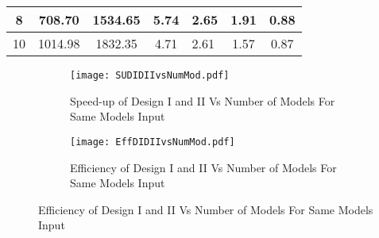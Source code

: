 \begin{table}
{\begin{tabular}{|c|c|c|c|l|c|c|}
8                                                                             & 708.70                                                                                                                                                                                                                        & 1534.65                                                                                                                                                                                                                     & 5.74                                                                                                                        & 2.65                                                                                                                                               & 1.91                                                                                   & 0.88                                                                                    \\ \hline
10                                                                            & 1014.98                                                                                                                                                                                                                       & 1832.35                                                                                                                                                                                                                     & 4.71                                                                                                                        & 2.61                                                                                                                                              & 1.57                                                                                   & 0.87                                                                                    \\ \hline
\end{tabular}}
\end{table}

\begin{figure}
\centering
\captionsetup[subfigure]{labelformat=empty}
\begin{subfigure}
\centering
\texttt{[image: SUDIDIIvsNumMod.pdf]}
\caption{Speed-up of Design I and II Vs Number of Models For Same Models Input}
\label{fig:SUDIDIIvsNumMod}
\end{subfigure}
\begin{subfigure}
\centering
\texttt{[image: EffDIDIIvsNumMod.pdf]}
\caption{Efficiency of Design I and II Vs Number of Models For Same Models Input}
\label{fig:EffDIDIIvsNumMod}
\end{subfigure}
\end{figure}

